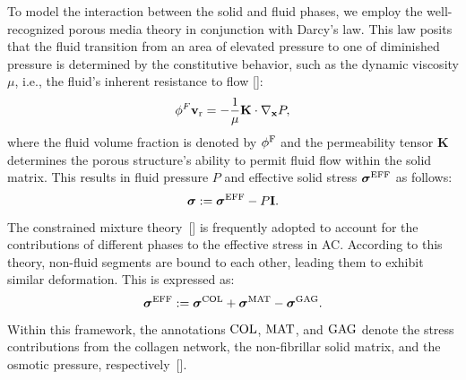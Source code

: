To model the interaction between the solid and fluid phases, we employ the well-recognized porous media theory in conjunction with Darcy's law. This law posits that the fluid transition from an area of elevated pressure to one of diminished pressure is determined by the constitutive behavior, such as the dynamic viscosity $\mu$, i.e., the fluid's inherent resistance to flow [\cite{karl1943,fa1979}]:
%
\begin{equation}\label{eq-darcy}
    \phi^F \mathbf{v}_{\rm r} = -\frac{1}{\mu }\mathbf{K} \cdot \nabla_\mathbf{x} P,
\end{equation}
%
where the fluid volume fraction is denoted by $\phi^{\rm F}$ and the permeability tensor $\mathbf{K}$ determines the porous structure's ability to permit fluid flow within the solid matrix. This results in fluid pressure $P$ and effective solid stress $\boldsymbol{\sigma}^{\rm EFF}$ as follows:
%
\begin{equation}\label{eq-stress}
    \boldsymbol{\sigma} :=  \boldsymbol{\sigma}^{\rm EFF} - P\mathbf{I}.
\end{equation}
%
The constrained mixture theory~[\cite{klisch1999}] is frequently adopted to account for the contributions of different phases to the effective stress in AC. According to this theory, non-fluid segments are bound to each other, leading them to exhibit similar deformation. This is expressed as:
%
\begin{equation}\label{eq-cartilage_solid}
    \boldsymbol{\sigma}^{\rm{EFF}} :=  \boldsymbol{\sigma}^{\rm{COL}} + \boldsymbol{\sigma}^{\rm{MAT}} - \boldsymbol{\sigma}^{\rm{GAG}}.
\end{equation}
%
Within this framework, the annotations ${\rm COL}$, ${\rm MAT}$, and ${\rm GAG}$ denote the stress contributions from the collagen network, the non-fibrillar solid matrix, and the osmotic pressure, respectively~[\cite{mow1980,wilson2005,sajjadinia2019}].

